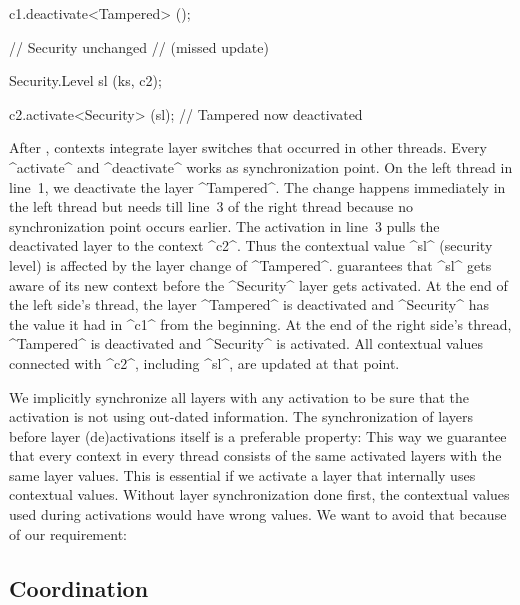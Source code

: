 \begin{multicols}{2}
\begin{code}[language=Cpp,xleftmargin=0ex,xrightmargin=0ex]
c1.deactivate<Tampered> ();

// Security unchanged
// (missed update)
\end{code}

\columnbreak

\begin{code}[language=Cpp,xleftmargin=0ex,xrightmargin=0ex,numbers=right]
Security.Level sl (ks, c2);

c2.activate<Security> (sl);
// Tampered now deactivated
\end{code}
\end{multicols}

After , contexts integrate layer switches that occurred in other threads.
Every ^activate^ and ^deactivate^ works as synchronization point.
On the left thread in line~1, we deactivate the layer ^Tampered^.
The change happens immediately in the left thread but needs till line~3 of the right thread because no synchronization point occurs earlier.
The activation in line~3 pulls the deactivated layer to the context ^c2^.
Thus the contextual value ^sl^ (security level) is affected by the layer change of ^Tampered^.
\elektra{} guarantees that ^sl^ gets aware of its new context before the ^Security^ layer gets activated.
At the end of the left side's thread, the layer ^Tampered^ is deactivated and ^Security^ has the value it had in ^c1^ from the beginning.
At the end of the right side's thread, ^Tampered^ is deactivated and ^Security^ is activated.
All contextual values connected with ^c2^, including ^sl^, are updated at that point.

We implicitly synchronize all layers with any activation to be sure that the activation is not using out-dated information.
The synchronization of layers before layer (de)activations itself is a preferable property:
This way we guarantee that every context in every thread consists of the same activated layers with the same layer values.
This is essential if we activate a layer that internally uses contextual values.
Without layer synchronization done first, the contextual values used during activations would have wrong values.
We want to avoid that because of our requirement:
\reqConsistency*

\subsection{Coordination}
\label{sec:thread-context}

